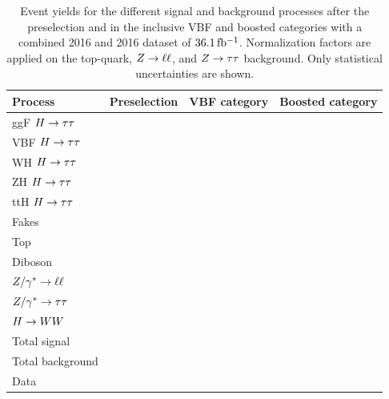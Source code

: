 \begin{table}[htpb]
    \centering
    \caption{Event yields for the different signal and background processes after the preselection
             and in the inclusive VBF and boosted categories with a combined 2016 and 2016 dataset of $\unit[36.1]{fb^{-1}}$.
             Normalization factors are applied on the top-quark, $Z \to \ell \ell$, and $Z \to \tau \tau$ background.
             Only statistical uncertainties are shown.}\label{tab:event_selection:yields}
    \begin{tabular}{lrrr}
        \toprule
        Process             & Preselection & VBF category & Boosted category \\ \midrule
        ggF $H \to \tau \tau$          & & & \\
        VBF $H \to \tau \tau$          & & & \\
        WH  $H \to \tau \tau$          & & & \\
        ZH  $H \to \tau \tau$          & & & \\
        ttH $H \to \tau \tau$          & & & \\ \midrule
        Fakes               & & & \\
        Top                 & & & \\
        Diboson             & & & \\
        $Z / \gamma^* \to \ell \ell$         & & & \\
        $Z / \gamma^* \to \tau \tau$         & & & \\
        $H \to WW$              & & & \\ \midrule
        Total signal        & & & \\
        Total background    & & & \\ \midrule
        Data                & & & \\ \bottomrule
    \end{tabular}
\end{table}
